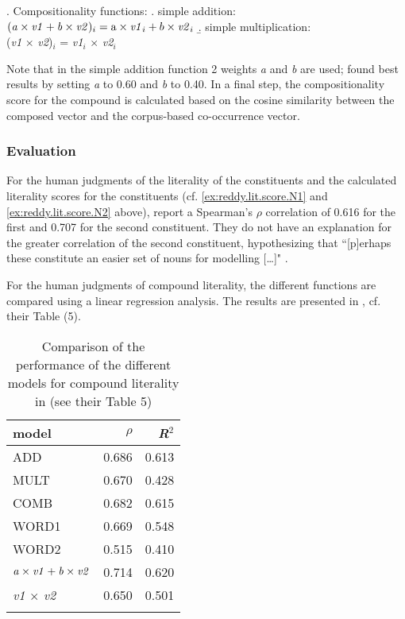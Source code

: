 \ex. Compositionality functions:
\a. simple addition:\\$(\text{\textit{a}} \times \text{\textit{v1}} + \text{\textit{b}} \times \text{\textit{v2}})_i = \text{a} \times \text{\textit{v1}}_i + b \times \text{\textit{v2}}_i$
\b. simple multiplication:\\ (\emph{v1} $\times$ \emph{v2})$_i$ = \emph{v1}$_i$ $\times$ \emph{v2}$_i$ 

Note that in the simple addition function 2 weights \emph{a} and
\emph{b} are used; \citet{Reddyetal:2011}
found best results by setting \emph{a} to 0.60 and \emph{b} to
0.40. In a final step, the compositionality score for the compound is
calculated based on the cosine similarity between the composed vector
and the corpus-based co-occurrence vector.

\subsubsection{Evaluation}
For the human judgments of the literality of the constituents and the
calculated literality scores for the constituents
(cf. \ref{ex:reddy.lit.score.N1} and \ref{ex:reddy.lit.score.N2} above), \citet{Reddyetal:2011} report
a Spearman's $\rho$ correlation of
0.616 for the first and 0.707 for the second constituent. They do not
have an explanation for the greater correlation of the second
constituent, hypothesizing that ``[p]erhaps these constitute an easier
set of nouns for modelling [\dots]" \citep[216]{Reddyetal:2011}.


For the human judgments of compound literality, the different functions
are compared using a linear regression analysis. The results are
presented in , cf. their Table (5).  

\begin{table}[!htb]
  \centering
  \begin{tabular}{lrr}\lsptoprule
    model&$\rho$&\emph{R}$^2$\\\midrule
ADD&0.686&0.613\\
MULT&0.670&0.428\\
COMB&0.682&0.615\\
WORD1&0.669&0.548\\
WORD2&0.515&0.410\\
$\text{\textit{a}} \times \text{\textit{v1}} + \text{\textit{b}} \times \text{\textit{v2}}$&0.714&0.620\\
\emph{v1} $\times$ \emph{v2}&0.650&0.501\\\lspbottomrule
  \end{tabular}
  \caption{Comparison of the performance of the different models for compound literality in \citet{Reddyetal:2011} (see their Table 5)}
\label{tab:reddyResults}\end{table}

